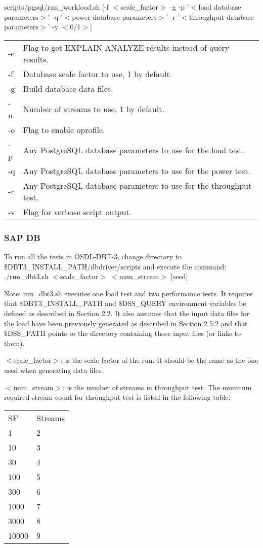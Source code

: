 \documentclass{article}
\begin{document}
\noindent
scripts/pgsql/run\_workload.sh [-f $<$scale\_factor$>$ -g -p '$<$load database parameters$>$' -q '$<$power database parameters$>$' -r '$<$throughput database parameters$>$' -y $<$0/1$>$]
\begin{tabular}[c]{ll} 
-e      & Flag to get EXPLAIN ANALYZE results instead of query results. \\
-f      & Database scale factor to use, 1 by default. \\
-g      & Build database data files. \\
-n      & Number of streams to use, 1 by default. \\
-o      & Flag to enable oprofile. \\
-p      & Any PostgreSQL database parameters to use for the load test. \\
-q      & Any PostgreSQL database parameters to use for the power test. \\
-r      & Any PostgreSQL database parameters to use for the throughput test. \\
-v      & Flag for verbose script output. \\
\end{tabular}

\subsubsection{SAP DB}

\noindent
To run all the tests in OSDL-DBT-3, change directory to
\$DBT3\_INSTALL\_PATH/dbdriver/scripts and execute the command: \\
\indent ./run\_dbt3.sh  $<$scale\_factor$>$ $<$num\_stream$>$ [seed]

\noindent
Note:  run\_dbt3.sh executes one load test and two performance tests.
It requires that \$DBT3\_INSTALL\_PATH and \$DSS\_QUERY environment
variables be defined as described in Section 2.2.  It also assumes
that the input data files for the load have been previously generated
as described in Section 2.5.2 and that \$DSS\_PATH points to the
directory containing those input files (or links to them).

\noindent
$<$scale\_factor$>$: is the scale factor of the run.  It should be the
same as the one used when generating data files.

\noindent
$<$num\_stream$>$: is the number of streams in throughput test.  The
minimum required stream count for throughput test is listed in the
following table: \\
\begin{tabular}[c]{ll}
SF	& Streams \\
1	& 2 \\
10	& 3 \\
30	& 4 \\
100	& 5 \\
300	& 6 \\
1000	& 7 \\
3000	& 8 \\
10000	& 9 \\
\end{tabular}
\end{document}
